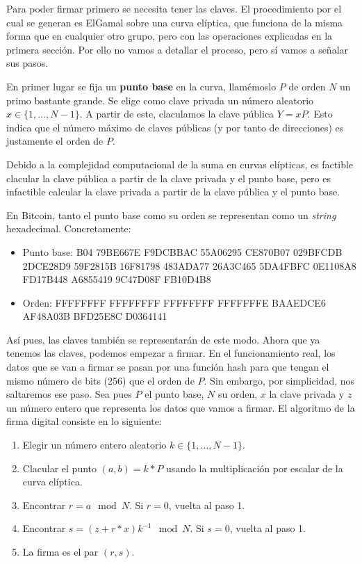 \documentclass[twoside]{article}
\theoremstyle{definition}
\begin{document}
Para poder firmar primero se necesita tener las claves. El procedimiento por el cual se generan es ElGamal sobre una curva elíptica, que funciona de la misma forma que en cualquier otro grupo, pero con las operaciones explicadas en la primera sección.  Por ello no vamos a detallar el proceso, pero sí vamos a señalar sus pasos. 

En primer lugar se fija un \textbf{punto base} en la curva, llamémoslo $P$ de orden $N$ un primo bastante grande. Se elige como clave privada un número aleatorio $x\in\{1,\dots, N-1\}$. A partir de este, claculamos la clave pública $Y=xP$. Esto indica que el número máximo de claves públicas (y por tanto de direcciones) es justamente el orden de $P$. 

Debido a la complejidad computacional de la suma en curvas elípticas, es factible clacular la clave pública a partir de la clave privada y el punto base, pero es infactible calcular la clave privada a partir de la clave pública y el punto base. 

En Bitcoin, tanto el punto base como su orden se representan como un \emph{string} hexadecimal. Concretamente:
\begin{itemize}
\item Punto base: B04 79BE667E F9DCBBAC 55A06295 CE870B07 029BFCDB 2DCE28D9 59F2815B 16F81798 483ADA77 26A3C465 5DA4FBFC 0E1108A8 FD17B448 A6855419 9C47D08F FB10D4B8
\item Orden:  FFFFFFFF FFFFFFFF FFFFFFFF FFFFFFFE BAAEDCE6 AF48A03B BFD25E8C D0364141
\end{itemize}

Así pues, las claves también se representarán de este modo. Ahora que ya tenemos las claves, podemos empezar a firmar. En el funcionamiento real, los datos que se van a firmar se pasan por una función hash para que tengan el mismo número de bits (256) que el orden de $P$. Sin embargo, por simplicidad, nos saltaremos ese paso. Sea pues $P$ el punto base, $N$ su orden, $x$ la clave privada y $z$ un número entero que representa los datos que vamos a firmar. El algoritmo de la firma digital consiste en lo siguiente:
\begin{enumerate}
\item Elegir un número entero aleatorio $k\in\{1,\dots,N-1\}$.
\item Clacular el punto $(a,b)=k*P$ usando la multiplicación por escalar de la curva elíptica. 
\item Encontrar $r= a\mod N$. Si $r=0$, vuelta al paso 1.
\item Encontrar $s= (z+r*x)k^{-1}\mod N$. Si $s=0$, vuelta al paso 1. 
\item La firma es el par $(r,s)$. 
\end{enumerate}
\end{document}
